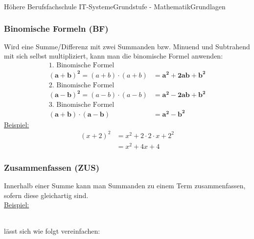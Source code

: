 \documentclass[11pt,twocolumn,oneside,openany,headings=optiontotoc,11pt,numbers=noenddot]{article}
\begin{document}
\begin{worksheet}{Höhere Berufsfachschule IT-Systeme}{Grundstufe - Mathematik}{Grundlagen}
		\subsubsection*{Binomische Formeln (BF)}
		Wird eine Summe/Differenz mit zwei Summanden bzw. Minuend und Subtrahend mit sich selbst multipliziert, kann man die binomische Formel anwenden:\\
		\begin{align*}
			\text{1. Binomische Formel}\\
			\mathbf{(a+b)^2} = (a + b)\cdot{}(a + b) & = \mathbf{a^2 + 2ab + b^2}\\
			\text{2. Binomische Formel}\\
			\mathbf{(a-b)^2} = (a - b)\cdot{}(a - b) & = \mathbf{a^2 - 2ab + b^2}\\
			\text{3. Binomische Formel}\\
			\mathbf{(a + b)\cdot{}(a - b)} & = \mathbf{a^2 - b^2}
		\end{align*}
		\underline{Beispiel:}
		\begin{align*}
			(x + 2)^2 & = x^2 + 2\cdot{}2\cdot{}x + 2^2\\
			& = x^2 + 4x + 4
		\end{align*}
		\subsubsection*{Zusammenfassen (ZUS)}
		Innerhalb einer Summe kann man Summanden zu einem Term zusammenfassen, sofern diese \glqq{}gleichartig\grqq{} sind.\\
		\underline{Beispiel:}\\
		     \\
		\par\noindent
		lässt sich wie folgt vereinfachen:\\
		  

\end{worksheet}
\end{document}
